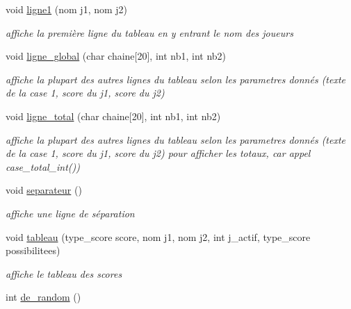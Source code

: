 \begin{DoxyCompactItemize}
void \mbox{\hyperlink{yams___cleo___martin-_colleu__2_80_8c_ae8b366432ca1376ab9fd71104cf988e4}{ligne1}} (nom j1, nom j2)
\begin{DoxyCompactList}\small\item\em affiche la première ligne du tableau en y entrant le nom des joueurs \end{DoxyCompactList}\item 
void \mbox{\hyperlink{yams___cleo___martin-_colleu__2_80_8c_a7566741f40c636a12c1446addc70a13b}{ligne\+\_\+global}} (char chaine\mbox{[}20\mbox{]}, int nb1, int nb2)
\begin{DoxyCompactList}\small\item\em affiche la plupart des autres lignes du tableau selon les parametres donnés (texte de la case 1, score du j1, score du j2) \end{DoxyCompactList}\item 
void \mbox{\hyperlink{yams___cleo___martin-_colleu__2_80_8c_a95b368ec8ea7cec19093abf65cfb438c}{ligne\+\_\+total}} (char chaine\mbox{[}20\mbox{]}, int nb1, int nb2)
\begin{DoxyCompactList}\small\item\em affiche la plupart des autres lignes du tableau selon les parametres donnés (texte de la case 1, score du j1, score du j2) pour afficher les totaux, car appel case\+\_\+total\+\_\+int()) \end{DoxyCompactList}\item 
\mbox{\label{yams___cleo___martin-_colleu__2_80_8c_ab416e0541f1d6204aed0b40c78def20b}} 
void \mbox{\hyperlink{yams___cleo___martin-_colleu__2_80_8c_ab416e0541f1d6204aed0b40c78def20b}{separateur}} ()
\begin{DoxyCompactList}\small\item\em affiche une ligne de séparation \end{DoxyCompactList}\item 
void \mbox{\hyperlink{yams___cleo___martin-_colleu__2_80_8c_a1d1c5c29ca6650e0c9995d76c80a1cb5}{tableau}} (type\+\_\+score score, nom j1, nom j2, int j\+\_\+actif, type\+\_\+score possibilitees)
\begin{DoxyCompactList}\small\item\em affiche le tableau des scores \end{DoxyCompactList}\item 
int \mbox{\hyperlink{yams___cleo___martin-_colleu__2_80_8c_a9f85afcdbd64730f976350802b5139de}{de\+\_\+random}} ()

\end{DoxyCompactItemize}
